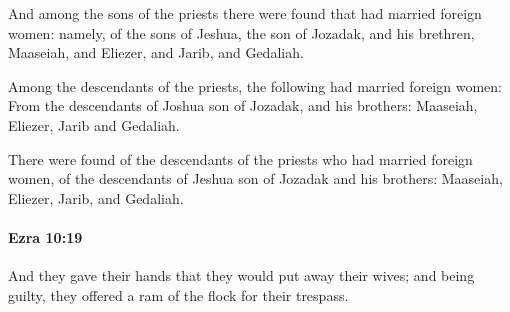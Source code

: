 			\begin{versebox}
					\item[BHS] 
					\item[LXX] 
					\item[ASV] And among the sons of the priests there were found that had married foreign women: namely, of the sons of Jeshua, the son of Jozadak, and his brethren, Maaseiah, and Eliezer, and Jarib, and Gedaliah.
					\item[NIV] Among the descendants of the priests, the following had married foreign women: From the descendants of Joshua son of Jozadak, and his brothers: Maaseiah, Eliezer, Jarib and Gedaliah.
					\item[NRSV] There were found of the descendants of the priests who had married foreign women, of the descendants of Jeshua son of Jozadak and his brothers: Maaseiah, Eliezer, Jarib, and Gedaliah.
			\end{versebox}

		\paragraph{Ezra 10:19} %
			\label{EZRA-10-19}

			And they gave their hands that they would put away their wives; and being guilty, they offered a ram of the flock for their trespass.


